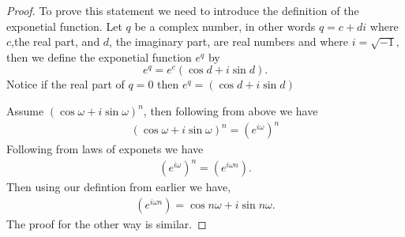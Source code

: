 \documentclass[12pt]{article}
\begin{document}
        \begin{proof}
          To prove this statement we need to introduce the definition of the exponetial function. Let $q$ be a complex number, in other words $q = c + di$ where $c$,the real part, and $d$, the imaginary part, are real numbers and where $i = \sqrt{-1},$ then we define the exponetial function $e^q$ by $$ e^q = e^c(\cos d +i\sin d ) .$$Notice if the real part of $q=0$ then $e^q = (\cos d +i\sin d )$  
          
          Assume $(\cos\omega + i\sin\omega)^n$, then following from above we have 
          \begin{align*}
            (\cos\omega + i\sin\omega)^n = (e^{i\omega})^n
          \end{align*}
          Following from laws of exponets we have
          \begin{align*}
            (e^{i\omega})^n = (e^{i\omega n}).
          \end{align*}
          Then using our defintion from earlier we have,
          \begin{align*}
            (e^{i\omega n})= \cos n\omega+i\sin n\omega.
          \end{align*}
          The proof for the other way is similar.
        \end{proof}  
\end{document}
